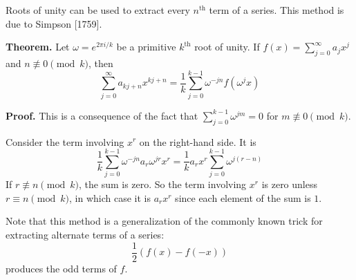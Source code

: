 \documentclass[12pt]{article}
\begin{document}
Roots of unity can be used to extract every $n^\mathrm{th}$ term of a series. This method is due to Simpson [1759]. 

\textbf{Theorem.} Let $\omega=e^{2\pi i/k}$ be a primitive $k^\mathrm{th}$ root of unity. If $f(x)=\sum_{j=0}^{\infty} a_j x^j$ and $n\not\equiv 0\pmod k$, then
\[\sum_{j=0}^{\infty} a_{kj+n}x^{kj+n}=\frac{1}{k}\sum_{j=0}^{k-1}\omega^{-jn}f(\omega^{j}x)\]

\textbf{Proof.}
This is a consequence of the fact that $\sum_{j=0}^{k-1}\omega^{jm}=0$ for $m\not\equiv 0\pmod k$.

Consider the term involving $x^r$ on the right-hand side. It is
\[\frac{1}{k}\sum_{j=0}^{k-1}\omega^{-jn}a_r\omega^{jr}x^r=\frac{1}{k}a_rx^r\sum_{j=0}^{k-1}\omega^{j(r-n)}\]
If $r\not\equiv n\pmod k$, the sum is zero. So the term involving $x^r$ is zero unless $r\equiv n\pmod k$, in which case it is $a_rx^r$ since each element of the sum is $1$.

Note that this method is a generalization of the commonly known trick for extracting alternate terms of a series:
\[\frac{1}{2}(f(x)-f(-x))\]
produces the odd terms of $f$.
\end{document}
